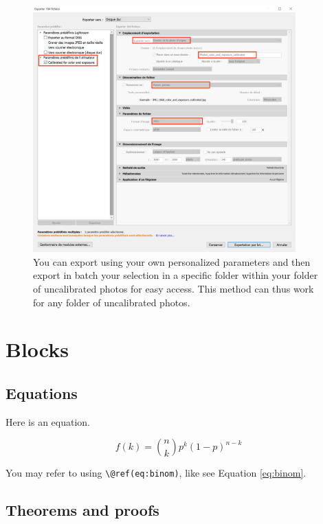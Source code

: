 \documentclass[
]{book}
\theoremstyle{definition}
\theoremstyle{definition}
\theoremstyle{definition}
\theoremstyle{definition}
\theoremstyle{remark}
\begin{document}
\begin{figure}
\hypertarget{export_parameters}{%
\centering
\includegraphics[width=0.9\textwidth,height=\textheight]{Figures/export_capture_1.png}
\caption{You can export using your own personalized parameters and then export
in batch your selection in a specific folder within your folder of
uncalibrated photos for easy access. This method can thus work for any
folder of uncalibrated
photos.}\label{export_parameters}
}
\end{figure}

\hypertarget{blocks}{%
\chapter{Blocks}\label{blocks}}

\hypertarget{equations}{%
\section{Equations}\label{equations}}

Here is an equation.

\begin{equation} 
  f\left(k\right) = \binom{n}{k} p^k\left(1-p\right)^{n-k}
  \label{eq:binom}
\end{equation}

You may refer to using \texttt{\textbackslash{}@ref(eq:binom)}, like see Equation \eqref{eq:binom}.

\hypertarget{theorems-and-proofs}{%
\section{Theorems and proofs}\label{theorems-and-proofs}}
\end{document}
